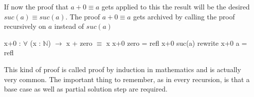 If now the proof that $a + 0 \equiv a$ gets applied to this the result will be the desired $suc(a) \equiv suc(a)$. The proof $a + 0 \equiv a$ gets archived by calling the proof recursively on $a$ instead of $suc(a)$

\begin{codesnippet}[mathescape=true, caption={Proof of addition to zero in Agda}, label={codeSnippet:x_plus_zero_agda}]
x+0 : $\forall$ (x : $\mathbb{N}$) $\rightarrow$ x + zero $\equiv$ x
x+0 zero = refl
x+0 suc(a) rewrite x+0 a = refl
\end{codesnippet}

This kind of proof is called proof by induction in mathematics and is actually very common.
The important thing to remember, as in every recursion, is that a base case as well as partial solution step are required.
